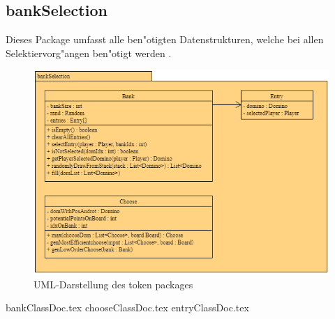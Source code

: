 \subsection{bankSelection}
\label{ss:bankSelection}
\FloatBarrier
Dieses Package umfasst alle ben"otigten Datenstrukturen, welche bei allen Selektiervorg"angen ben"otigt werden . 

\begin{figure}
	\centering
	\includegraphics{pics/bankSelectionUMLPackage}
	\caption{UML-Darstellung des token packages}
	\label{fig:bankSelectionPackage}
\end{figure}

{bankClassDoc.tex}
{chooseClassDoc.tex}
{entryClassDoc.tex}